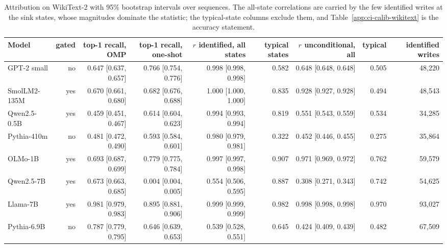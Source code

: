 \begin{table}[H]\centering\scriptsize
\caption{Attribution on WikiText-2 with 95\% bootstrap intervals over sequences. The all-state correlations are carried by the few identified writes at the sink states, whose magnitudes dominate the statistic; the typical-state columns exclude them, and Table~\ref{app:ci-calib-wikitext} is the accuracy statement.}\label{app:ci-attrib-wikitext}
\begin{adjustbox}{max width=\linewidth}
\begin{tabular}{lrrrrrrrr}\toprule
Model & gated & top-1 recall, OMP & top-1 recall, one-shot & $r$ identified, all states & typical states & $r$ unconditional, all & typical & identified writes \\ \midrule
GPT-2 small & no & 0.647 [0.637, 0.657] & 0.766 [0.754, 0.776] & 0.998 [0.998, 0.998] & 0.582 & 0.648 [0.648, 0.648] & 0.505 & 48,220 \\
SmolLM2-135M & yes & 0.670 [0.661, 0.680] & 0.682 [0.676, 0.688] & 1.000 [1.000, 1.000] & 0.835 & 0.928 [0.927, 0.928] & 0.494 & 48,543 \\
Qwen2.5-0.5B & yes & 0.459 [0.451, 0.467] & 0.614 [0.604, 0.623] & 0.994 [0.993, 0.994] & 0.819 & 0.551 [0.543, 0.559] & 0.534 & 34,285 \\
Pythia-410m & no & 0.481 [0.472, 0.490] & 0.593 [0.584, 0.601] & 0.980 [0.979, 0.981] & 0.322 & 0.452 [0.446, 0.455] & 0.275 & 35,864 \\
OLMo-1B & yes & 0.693 [0.687, 0.699] & 0.779 [0.775, 0.784] & 0.997 [0.997, 0.998] & 0.907 & 0.971 [0.969, 0.972] & 0.762 & 59,579 \\
Qwen2.5-7B & yes & 0.673 [0.663, 0.685] & 0.004 [0.004, 0.005] & 0.554 [0.506, 0.595] & 0.887 & 0.308 [0.271, 0.343] & 0.742 & 54,625 \\
Llama-7B & yes & 0.981 [0.979, 0.983] & 0.895 [0.881, 0.906] & 0.999 [0.999, 0.999] & 0.982 & 0.998 [0.998, 0.998] & 0.970 & 93,027 \\
Pythia-6.9B & no & 0.787 [0.779, 0.795] & 0.646 [0.639, 0.653] & 0.539 [0.528, 0.551] & 0.645 & 0.424 [0.409, 0.439] & 0.482 & 67,509 \\
\bottomrule\end{tabular}\end{adjustbox}
\end{table}
